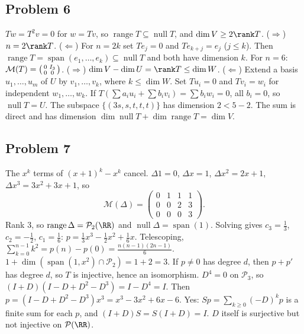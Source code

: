 \documentclass[11pt]{scrartcl}
\DeclareMathOperator{\nul}{null}
\DeclareMathOperator{\range}{range}
\DeclareMathOperator{\spn}{span}
\newcommand{\PP}{\mathcal P}
\newcommand{\MM}{\mathcal M}
\begin{document}
\subsection*{Problem 6}
\begin{enumerate}[(a)]
  \ii $Tw=T^2v=0$ for $w=Tv$, so $\range T\subseteq\nul T$, and $\dim V\ge2\rank T$.
  \ii ($\Rightarrow$) $n=2\rank T$.
  ($\Leftarrow$) For $n=2k$ set $Te_j=0$ and $Te_{k+j}=e_j$ ($j\le k$).
  Then $\range T=\spn(e_1,\dots,e_k)\subseteq\nul T$ and both have dimension $k$.
  For $n=6$: $\MM(T)=\begin{psmallmatrix}0&I_3\\0&0\end{psmallmatrix}$.
  \ii ($\Rightarrow$) $\dim V-\dim U=\rank T\le\dim W$.
  ($\Leftarrow$) Extend a basis $u_1,\dots,u_m$ of $U$ by $v_1,\dots,v_k$, where $k\le\dim W$.
  Set $Tu_i=0$ and $Tv_i=w_i$ for independent $w_1,\dots,w_k$.
  If $T(\sum a_iu_i+\sum b_iv_i)=\sum b_iw_i=0$, all $b_i=0$, so $\nul T=U$.
  \ii The subspace $\{(3s,s,t,t,t)\}$ has dimension $2<5-2$.
  \ii The sum is direct and has dimension $\dim\nul T+\dim\range T=\dim V$.
\end{enumerate}

\subsection*{Problem 7}
\begin{enumerate}[(a)]
  \ii The $x^k$ terms of $(x+1)^k-x^k$ cancel.
  $\Delta1=0$, $\Delta x=1$, $\Delta x^2=2x+1$, $\Delta x^3=3x^2+3x+1$, so
  \[ \MM(\Delta)=\begin{pmatrix}0&1&1&1\\0&0&2&3\\0&0&0&3\end{pmatrix}. \]
  Rank $3$, so $\range\Delta=\PP_2(\RR)$ and $\nul\Delta=\spn(1)$.
  \ii Solving gives $c_3=\tfrac13$, $c_2=-\tfrac12$, $c_1=\tfrac16$:
  $p=\tfrac13x^3-\tfrac12x^2+\tfrac16x$.
  Telescoping, $\sum_{k=0}^{n-1}k^2=p(n)-p(0)=\tfrac{n(n-1)(2n-1)}{6}$.
  \ii $1+\dim(\spn(1,x^2)\cap\PP_2)=1+2=3$.
  \ii If $p\ne0$ has degree $d$, then $p+p'$ has degree $d$, so $T$ is injective, hence an isomorphism.
  $D^4=0$ on $\PP_3$, so $(I+D)(I-D+D^2-D^3)=I-D^4=I$.
  Then $p=(I-D+D^2-D^3)x^3=x^3-3x^2+6x-6$.
  \ii Yes: $Sp=\sum_{k\ge0}(-D)^kp$ is a finite sum for each $p$, and $(I+D)S=S(I+D)=I$.
  $D$ itself is surjective but not injective on $\PP(\RR)$.
\end{enumerate}
\end{document}
